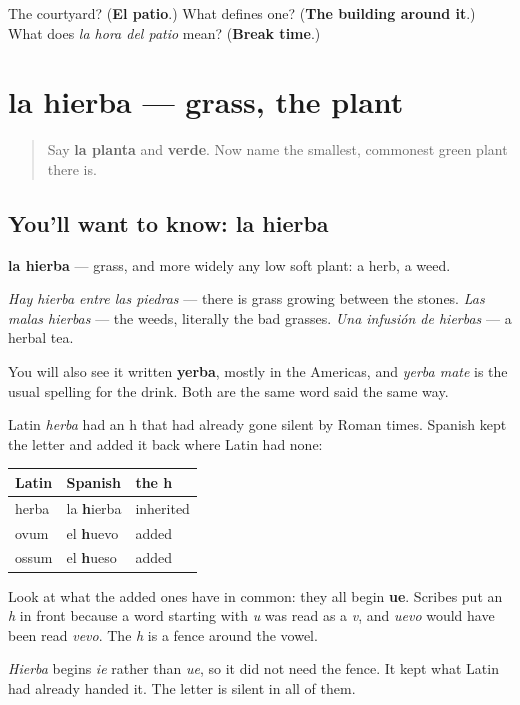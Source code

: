 \begin{tcolorbox}[breakable,colback=teal!4,colframe=teal!35!black,title={Before you move on}]
The courtyard? (\textbf{El patio}.) What defines one? (\textbf{The building around it}.) What does \emph{la hora del patio} mean? (\textbf{Break time}.)
\end{tcolorbox}
\section[la hierba]{la hierba — grass, the plant}

\label{lesson:ES-C450-hierba}



\begin{quote}
Say \textbf{la planta} and \textbf{verde}. Now name the smallest, commonest green plant there is.
\end{quote}

\subsection*{You'll want to know: la hierba}
\textbf{la hierba} — grass, and more widely any low soft plant: a herb, a weed.

\emph{Hay hierba entre las piedras} — there is grass growing between the stones. \emph{Las malas hierbas} — the weeds, literally the bad grasses. \emph{Una infusión de hierbas} — a herbal tea.

You will also see it written \textbf{yerba}, mostly in the Americas, and \emph{yerba mate} is the usual spelling for the drink. Both are the same word said the same way.

\begin{grammarlens}[title={Grammar Lens: the h that is not pronounced and not decorative}]
Latin \emph{herba} had an h that had already gone silent by Roman times. Spanish kept the letter and added it back where Latin had none:

\noindent
\begin{tabularx}{\linewidth}{@{}>{\raggedright\arraybackslash}X>{\raggedright\arraybackslash}X>{\raggedright\arraybackslash}X@{}}
\toprule
\textbf{Latin} & \textbf{Spanish} & \textbf{the h} \\
\midrule
herba & la \textbf{h}ierba & inherited \\
ovum & el \textbf{h}uevo & added \\
ossum & el \textbf{h}ueso & added \\
\bottomrule
\end{tabularx}

Look at what the added ones have in common: they all begin \textbf{ue}. Scribes put an \emph{h} in front because a word starting with \emph{u} was read as a \emph{v}, and \emph{uevo} would have been read \emph{vevo}. The \emph{h} is a fence around the vowel.

\emph{Hierba} begins \emph{ie} rather than \emph{ue}, so it did not need the fence. It kept what Latin had already handed it. The letter is silent in all of them.
\end{grammarlens}

